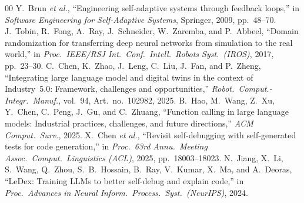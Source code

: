 \documentclass[conference]{IEEEtran}
\begin{document}
\begin{thebibliography}{00}
 Y.~Brun \textit{et al.}, ``Engineering self-adaptive systems through feedback loops,'' in \textit{Software Engineering for Self-Adaptive Systems}, Springer, 2009, pp.~48--70.
 J.~Tobin, R.~Fong, A.~Ray, J.~Schneider, W.~Zaremba, and P.~Abbeel, ``Domain randomization for transferring deep neural networks from simulation to the real world,'' in \textit{Proc.\ IEEE/RSJ Int.\ Conf.\ Intell.\ Robots Syst.\ (IROS)}, 2017, pp.~23--30.
 C.~Chen, K.~Zhao, J.~Leng, C.~Liu, J.~Fan, and P.~Zheng, ``Integrating large language model and digital twins in the context of Industry~5.0: Framework, challenges and opportunities,'' \textit{Robot.\ Comput.-Integr.\ Manuf.}, vol.~94, Art.~no.~102982, 2025.
 B.~Hao, M.~Wang, Z.~Xu, Y.~Chen, C.~Peng, J.~Gu, and C.~Zhuang, ``Function calling in large language models: Industrial practices, challenges, and future directions,'' \textit{ACM Comput.\ Surv.}, 2025.
 X.~Chen \textit{et al.}, ``Revisit self-debugging with self-generated tests for code generation,'' in \textit{Proc.\ 63rd Annu.\ Meeting Assoc.\ Comput.\ Linguistics (ACL)}, 2025, pp.~18003--18023.
 N.~Jiang, X.~Li, S.~Wang, Q.~Zhou, S.~B.~Hossain, B.~Ray, V.~Kumar, X.~Ma, and A.~Deoras, ``LeDex: Training LLMs to better self-debug and explain code,'' in \textit{Proc.\ Advances in Neural Inform.\ Process.\ Syst.\ (NeurIPS)}, 2024.
\end{thebibliography}
\end{document}
